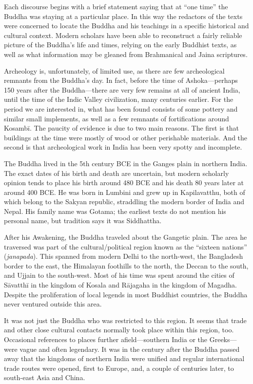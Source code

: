 \documentclass[12pt,openany]{book}%
\begin{document}
Each discourse begins with a brief statement saying that at “one time” the Buddha was staying at a particular place. In this way the redactors of the texts were concerned to locate the Buddha and his teachings in a specific historical and cultural context. Modern scholars have been able to reconstruct a fairly reliable picture of the Buddha’s life and times, relying on the early Buddhist texts, as well as what information may be gleaned from Brahmanical and Jaina scriptures.

Archeology is, unfortunately, of limited use, as there are few archeological remnants from the Buddha’s day. In fact, before the time of Ashoka—perhaps 150 years after the Buddha—there are very few remains at all of ancient India, until the time of the Indic Valley civilization, many centuries earlier. For the period we are interested in, what has been found consists of some pottery and similar small implements, as well as a few remnants of fortifications around \textsanskrit{Kosambī}. The paucity of evidence is due to two main reasons. The first is that buildings at the time were mostly of wood or other perishable materials. And the second is that archeological work in India has been very spotty and incomplete.

The Buddha lived in the 5th century BCE in the Ganges plain in northern India. The exact dates of his birth and death are uncertain, but modern scholarly opinion tends to place his birth around 480 BCE and his death 80 years later at around 400 BCE. He was born in Lumbini and grew up in Kapilavatthu, both of which belong to the Sakyan republic, straddling the modern border of India and Nepal. His family name was Gotama; the earliest texts do not mention his personal name, but tradition says it was Siddhattha.

After his Awakening, the Buddha traveled about the Gangetic plain. The area he traversed was part of the cultural/political region known as the “sixteen nations” (\textit{janapada}). This spanned from modern Delhi to the north-west, the Bangladesh border to the east, the Himalayan foothills to the north, the Deccan to the south, and Ujjain to the south-west. Most of his time was spent around the cities of \textsanskrit{Sāvatthī} in the kingdom of Kosala and \textsanskrit{Rājagaha} in the kingdom of Magadha. Despite the proliferation of local legends in most Buddhist countries, the Buddha never ventured outside this area.

It was not just the Buddha who was restricted to this region. It seems that trade and other close cultural contacts normally took place within this region, too. Occasional references to places further afield—southern India or the Greeks—were vague and often legendary. It was in the century after the Buddha passed away that the kingdoms of northern India were unified and regular international trade routes were opened, first to Europe, and, a couple of centuries later, to south-east Asia and China.
\end{document}

